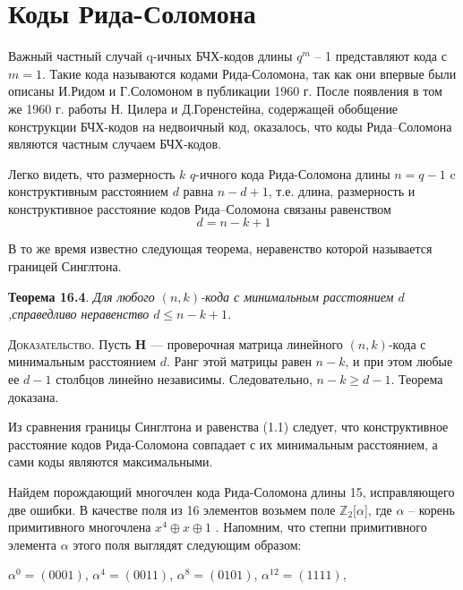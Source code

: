 \documentclass[12pt]{article}
\numberwithin{equation}{section} %
\begin{document}
	\tableofcontents %
	\newpage
	\section{Коды Рида-Соломона}
	
	Важный частный случай q-ичных БЧХ-кодов длины   $q^m$ -- 1 представляют кода с $m=1$. Такие кода называются кодами Рида-Соломона, так как они впервые были описаны И.Ридом и Г.Соломоном в публикации 1960 г. После появления в том же 1960 г. работы Н. Цилера и Д.Горенстейна, содержащей обобщение конструкции БЧХ-кодов на недвоичный код, оказалось, что коды Рида--Соломона являются частным случаем БЧХ-кодов.
	
	Легко видеть, что размерность $k$ $q$-ичного кода Рида-Соломона длины $n=q-1$ c конструктивным расстоянием $d$ равна $n-d+1$, т.е. длина, размерность и конструктивное расстояние кодов Рида--Соломона связаны равенством
	 \begin{equation}
	d=n-k+1
	 \label{eq.simple}
	\end{equation}
	
	
	В то же время известно следующая теорема, неравенство которой называется границей Синглтона.
	
	{\bf Теорема 16.4}. {\itshape Для любого $(n,k)$-кода с минимальным расстоянием $d$,справедливо неравенство $d \leq {n-k+1}$.}	
	
	{\scshape Доказательство}. Пусть $\mathbf H$ --- проверочная матрица линейного $(n,k)$-кода с минимальным расстоянием $d$. Ранг этой матрицы равен $n-k$, и при этом любые ее $d-1$ столбцов линейно независимы. Следовательно,  ${n-k}\geq {d-1}$. Теорема доказана.
	
	Из сравнения границы Синглтона и равенства (1.1) следует, что конструктивное расстояние кодов Рида-Соломона совпадает с их минимальным расстоянием, а сами коды являются максимальными.
	
	Найдем порождающий многочлен кода Рида-Соломона длины 15, исправляющего две ошибки. В качестве поля из 16 элементов возьмем поле $\mathbb {Z}_{2}$[$\alpha$], где   $\alpha$ -- корень примитивного многочлена $x^4 \oplus x \oplus 1$   . Напомним, что степни примитивного элемента $\alpha$  этого поля выглядят следующим образом:
	
    $\alpha^0=(0001)$,\hspace{1cm} $\alpha^4=(0011)$,\hspace{1cm} $\alpha^8=(0101)$,\hspace{1cm} $\alpha^{12}=(1111)$,
    
\end{document}
